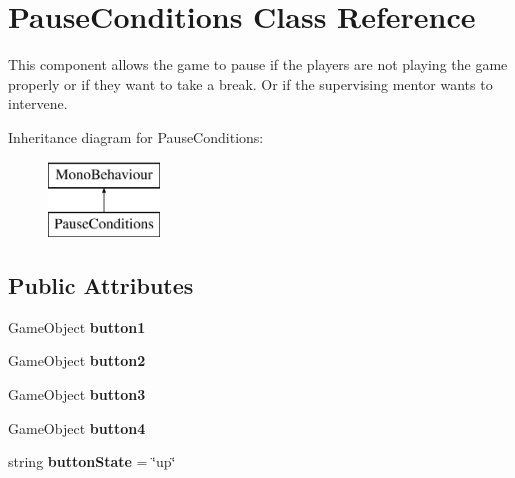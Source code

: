 \hypertarget{class_pause_conditions}{\section{Pause\+Conditions Class Reference}
\label{class_pause_conditions}
}


This component allows the game to pause if the players are not playing the game properly or if they want to take a break. Or if the supervising mentor wants to intervene.  


Inheritance diagram for Pause\+Conditions\+:\begin{figure}[H]
\begin{center}
\leavevmode
\includegraphics[height=2.000000cm]{class_pause_conditions}
\end{center}
\end{figure}
\subsection*{Public Attributes}
\begin{DoxyCompactItemize}
\item 
\hypertarget{class_pause_conditions_a7f54bf5a4189e3d26bbc97a1e2854e63}{Game\+Object {\bfseries button1}}\label{class_pause_conditions_a7f54bf5a4189e3d26bbc97a1e2854e63}

\item 
\hypertarget{class_pause_conditions_a04ca1e5c5090211701027657bb00980d}{Game\+Object {\bfseries button2}}\label{class_pause_conditions_a04ca1e5c5090211701027657bb00980d}

\item 
\hypertarget{class_pause_conditions_abe537000890aabbfa050bfa63890fd13}{Game\+Object {\bfseries button3}}\label{class_pause_conditions_abe537000890aabbfa050bfa63890fd13}

\item 
\hypertarget{class_pause_conditions_a0a07c7c652aedc49d722d046bec5ae4c}{Game\+Object {\bfseries button4}}\label{class_pause_conditions_a0a07c7c652aedc49d722d046bec5ae4c}

\item 
\hypertarget{class_pause_conditions_aa4c6398400a160dc567f2aa5c146631a}{string {\bfseries button\+State} = \char`\"{}up\char`\"{}}\label{class_pause_conditions_aa4c6398400a160dc567f2aa5c146631a}

\end{DoxyCompactItemize}


